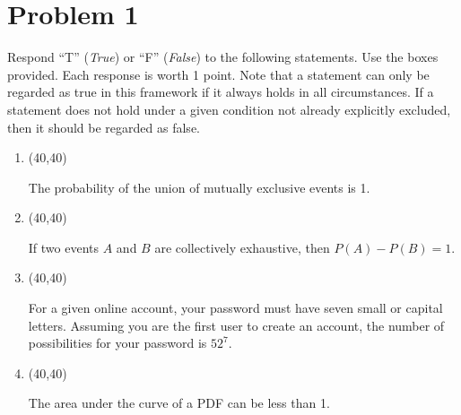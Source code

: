 \documentclass[12pt,twoside]{article}
\newcommand{\?}{\stackrel{?}{=}}
\newcommand{\gr}{\color{green!40!black}}
\begin{document}

\section*{Problem 1 }
Respond ``T'' ({\it True})  or  ``F'' (\textit{False}) to the following statements.
Use the boxes provided. Each response is worth 1 point.
Note that a statement can only be regarded as true in this framework if it always holds in all circumstances.
If a statement does not hold under a given condition not already explicitly excluded, then it should be regarded as false.

\begin{enumerate}[\bf (i)]
\item \hfill
  \begin{minipage}{.1\linewidth}
    \framebox(40,40){ \gr } %
  \end{minipage}\quad
  \begin{minipage}{.85\linewidth}
    The probability of the union of mutually exclusive events is 1.
  \end{minipage}
  \smallskip  
\item \hfill
  \begin{minipage}{.1\linewidth}
    \framebox(40,40){ \gr } %
  \end{minipage}\quad
  \begin{minipage}{.85\linewidth}
   If two events $A$ and $B$ are collectively exhaustive, then $P(A) - P(B) = 1$.%
  \end{minipage}
  \smallskip
\item \hfill
  \begin{minipage}{.1\linewidth}
    \framebox(40,40){ \gr }%
  \end{minipage}\quad
  \begin{minipage}{.85\linewidth}
    For a given online account, your password must have seven small or capital letters. Assuming you are the first user to create an account, the number of possibilities for your password is $52^{7}$.
  \end{minipage}
  \smallskip
\item \hfill
  \begin{minipage}{.1\linewidth}
    \framebox(40,40){ \gr } %
  \end{minipage}\quad
  \begin{minipage}{.85\linewidth}
    The area under the curve of a PDF can be less than 1.

\end{minipage}
\end{enumerate}
\end{document}

